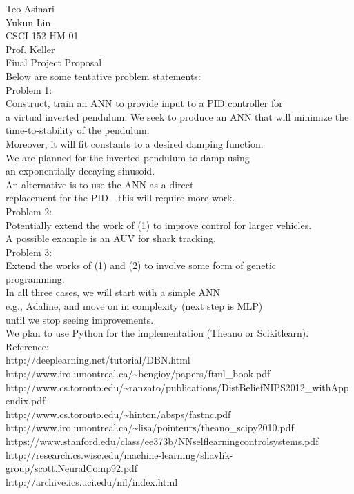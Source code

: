 \documentclass{article}
\begin{document}
\noindent Teo Asinari\\
Yukun Lin\\
CSCI 152 HM-01\\
Prof. Keller\\
Final Project Proposal\\

Below are some tentative problem statements:\\

Problem 1:\\
Construct, train an ANN to provide input to a PID controller for \\
a virtual inverted pendulum. We seek to produce an ANN that will minimize
the time-to-stability of the pendulum.\\
Moreover, it will fit constants to a desired damping function.\\
We are planned for the inverted pendulum to damp using \\
an exponentially decaying sinusoid.\\
An alternative is to use the ANN as a direct \\
replacement for the PID - this will require more work.\\

Problem 2:\\
Potentially extend the work of (1) to improve control for larger vehicles.\\
A possible example is an AUV for shark tracking.\\


Problem 3:\\
Extend the works of (1) and (2) to involve some form of genetic \\
programming.\\


\noindent In all three cases, we will start with a simple ANN\\
e.g., Adaline, and move on in complexity (next step is MLP)\\
until we stop seeing improvements.\\
We plan to use Python for the implementation (Theano or Scikitlearn).\\


Reference:\\
http://deeplearning.net/tutorial/DBN.html\\
http://www.iro.umontreal.ca/\textasciitilde bengioy/papers/ftml\_book.pdf\\
http://www.cs.toronto.edu/\textasciitilde ranzato/publications/DistBeliefNIPS2012\_withAppendix.pdf\\
http://www.cs.toronto.edu/\textasciitilde hinton/absps/fastnc.pdf\\
http://www.iro.umontreal.ca/\textasciitilde lisa/pointeurs/theano\_scipy2010.pdf\\
https://www.stanford.edu/class/ee373b/NNselflearningcontrolsystems.pdf\\
http://research.cs.wisc.edu/machine-learning/shavlik-group/scott.NeuralComp92.pdf\\
http://archive.ics.uci.edu/ml/index.html\\
\end{document}
